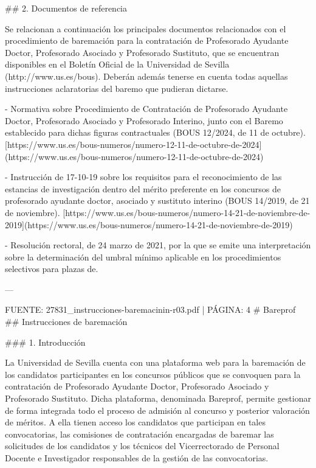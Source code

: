 \documentclass{article}
\begin{document}
\begin{itemize}
\begin{itemize}
\begin{scriptsize}
                  \#\# 2. Documentos de referencia

                  Se relacionan a continuación los principales documentos relacionados con el procedimiento de baremación para la contratación de Profesorado Ayudante Doctor, Profesorado Asociado y Profesorado Sustituto, que se encuentran disponibles en el Boletín Oficial de la Universidad de Sevilla (http://www.us.es/bous). Deberán además tenerse en cuenta todas aquellas instrucciones aclaratorias del baremo que pudieran dictarse.

                  - Normativa sobre Procedimiento de Contratación de Profesorado Ayudante Doctor, Profesorado Asociado y Profesorado Interino, junto con el Baremo establecido para dichas figuras contractuales (BOUS 12/2024, de 11 de octubre).
                    [https://www.us.es/bous-numeros/numero-12-11-de-octubre-de-2024](https://www.us.es/bous-numeros/numero-12-11-de-octubre-de-2024)

                  - Instrucción de 17-10-19 sobre los requisitos para el reconocimiento de las estancias de investigación dentro del mérito preferente en los concursos de profesorado ayudante doctor, asociado y sustituto interino (BOUS 14/2019, de 21 de noviembre).
                    [https://www.us.es/bous-numeros/numero-14-21-de-noviembre-de-2019](https://www.us.es/bous-numeros/numero-14-21-de-noviembre-de-2019)

                  - Resolución rectoral, de 24 marzo de 2021, por la que se emite una interpretación sobre la determinación del umbral mínimo aplicable en los procedimientos selectivos para plazas de.

                  ---

                  FUENTE: 27831\_instrucciones-baremacinin-r03.pdf | PÁGINA: 4
                  \# Bareprof
                  \#\# Instrucciones de baremación

                  \#\#\# 1. Introducción

                  La Universidad de Sevilla cuenta con una plataforma web para la baremación de los candidatos participantes en los concursos públicos que se convoquen para la contratación de Profesorado Ayudante Doctor, Profesorado Asociado y Profesorado Sustituto. Dicha plataforma, denominada Bareprof, permite gestionar de forma integrada todo el proceso de admisión al concurso y posterior valoración de méritos. A ella tienen acceso los candidatos que participan en tales convocatorias, las comisiones de contratación encargadas de baremar las solicitudes de los candidatos y los técnicos del Vicerrectorado de Personal Docente e Investigador responsables de la gestión de las convocatorias.


\end{scriptsize}
\end{itemize}
\end{itemize}
\end{document}
